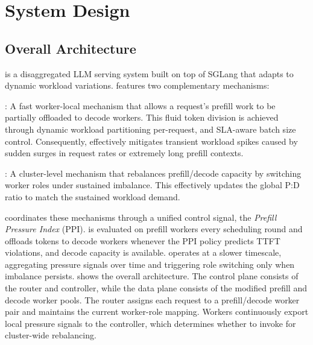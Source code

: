 \section{System Design}
\label{sec:design}

\subsection{Overall Architecture}
\label{subsec:overall-arch}


\name is a disaggregated LLM serving system built on top of SGLang that adapts to dynamic workload variations. \name features two complementary mechanisms:

\noindent
\textbf{\instance}: A fast worker-local mechanism that allows a request's prefill work to be partially offloaded to decode workers. This fluid token division is achieved through dynamic workload partitioning per-request, and SLA-aware batch size control. Consequently, \instance effectively mitigates transient workload spikes caused by sudden surges in request rates or extremely long prefill contexts.

\noindent
\textbf{\cluster}: A cluster-level mechanism that rebalances prefill/decode capacity by switching worker roles under sustained imbalance. This effectively updates the global P:D ratio to match the sustained workload demand.

\name coordinates these mechanisms through a unified control signal, the \textit{Prefill Pressure Index} (PPI).
\instance is evaluated on prefill workers
every scheduling round and offloads tokens to decode workers whenever the PPI policy
predicts TTFT violations, and decode capacity is available.
\cluster operates at a slower timescale, aggregating pressure signals over time and triggering role switching only when imbalance persists.
 shows the overall architecture.
The control plane consists of the router and controller, while the data plane consists of the modified prefill and decode worker pools.
The router assigns each request to a prefill/decode worker pair and maintains the current worker-role mapping.
Workers continuously export local pressure signals to the controller, which determines whether to invoke \cluster for cluster-wide rebalancing.

